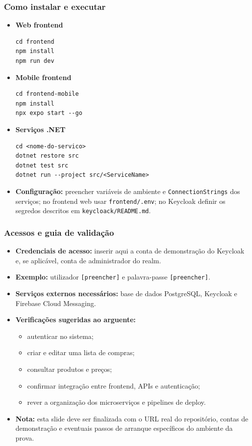 \documentclass[aspectratio=169]{beamer}
\begin{document}
\begin{frame}[fragile]
  \frametitle{Como instalar e executar}
  \small
  \begin{itemize}[leftmargin=1.6em]
    \item \textbf{Web frontend}
\begin{verbatim}
cd frontend
npm install
npm run dev
\end{verbatim}
    \item \textbf{Mobile frontend}
\begin{verbatim}
cd frontend-mobile
npm install
npx expo start --go
\end{verbatim}
    \item \textbf{Servi\c{c}os .NET}
\begin{verbatim}
cd <nome-do-servico>
dotnet restore src
dotnet test src
dotnet run --project src/<ServiceName>
\end{verbatim}
    \item \textbf{Configura\c{c}\~ao:} preencher vari\'aveis de ambiente e \texttt{ConnectionStrings} dos servi\c{c}os; no frontend web usar \texttt{frontend/.env}; no Keycloak definir os segredos descritos em \texttt{keycloack/README.md}.
  \end{itemize}
\end{frame}

\begin{frame}
  \frametitle{Acessos e guia de valida\c{c}\~ao}
  \small
  \begin{itemize}[leftmargin=1.6em]
    \item \textbf{Credenciais de acesso:} inserir aqui a conta de demonstra\c{c}\~ao do Keycloak e, se aplic\'avel, conta de administrador do realm.
    \item \textbf{Exemplo:} utilizador \texttt{[preencher]} e palavra-passe \texttt{[preencher]}.
    \item \textbf{Servi\c{c}os externos necess\'arios:} base de dados PostgreSQL, Keycloak e Firebase Cloud Messaging.
    \item \textbf{Verifica\c{c}\~oes sugeridas ao arguente:}
    \begin{itemize}[leftmargin=1.6em]
      \item autenticar no sistema;
      \item criar e editar uma lista de compras;
      \item consultar produtos e pre\c{c}os;
      \item confirmar integra\c{c}\~ao entre frontend, APIs e autentica\c{c}\~ao;
      \item rever a organiza\c{c}\~ao dos microservi\c{c}os e pipelines de deploy.
    \end{itemize}
    \item \textbf{Nota:} esta slide deve ser finalizada com o URL real do reposit\'orio, contas de demonstra\c{c}\~ao e eventuais passos de arranque espec\'ificos do ambiente da prova.
  \end{itemize}
\end{frame}
\end{document}
